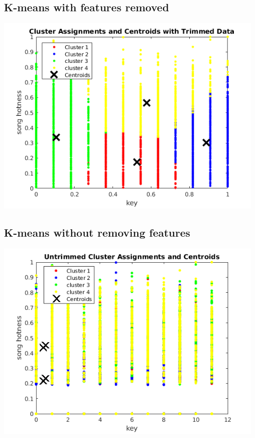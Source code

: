 \documentclass[12pt]{article}
\begin{document}
\subsection{K-means with features removed}
\label{subsec:trimmedKmeans}
\includegraphics[scale=0.6]{images/clustering/trimmedkMeans}
\subsection{K-means without removing features}
\label{subsec:untrimmedKmeans}
\includegraphics[scale=0.6]{images/clustering/untrimmedkmeans}
\end{document}
